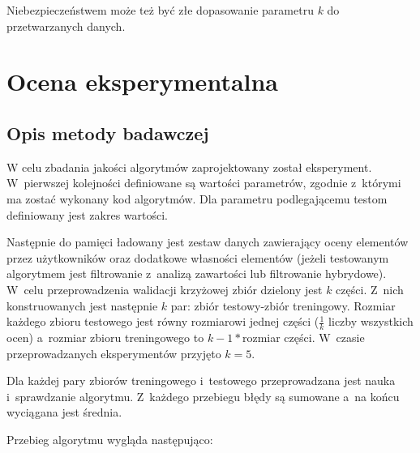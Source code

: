\documentclass[twoside]{iisthesis}
\begin{document}
		 Niebezpieczeństwem może też być złe dopasowanie parametru $k$ do przetwarzanych danych.
 
\chapter{Ocena eksperymentalna}
	\section{Opis metody badawczej}
	
		W celu zbadania jakości algorytmów zaprojektowany został eksperyment. W~pierwszej kolejności definiowane są wartości parametrów, zgodnie z~którymi ma zostać wykonany kod algorytmów. 
		Dla parametru podlegającemu testom definiowany jest zakres wartości. 
		
		Następnie do pamięci ładowany jest zestaw danych zawierający oceny elementów przez użytkowników oraz dodatkowe własności elementów (jeżeli testowanym algorytmem jest filtrowanie z~analizą zawartości lub filtrowanie hybrydowe). W~celu przeprowadzenia walidacji krzyżowej zbiór dzielony jest $k$ części. Z~nich konstruowanych jest następnie $k$ par: zbiór testowy-zbiór treningowy. Rozmiar każdego zbioru testowego jest równy rozmiarowi jednej części ($\frac{1}{k}$ liczby wszystkich ocen) a~rozmiar zbioru treningowego to $k-1*$rozmiar części. W~czasie przeprowadzanych eksperymentów przyjęto $k=5$.
		
		Dla każdej pary zbiorów treningowego i~testowego przeprowadzana jest nauka i~sprawdzanie algorytmu. Z~każdego przebiegu błędy są sumowane a~na końcu wyciągana jest średnia.
		
		Przebieg algorytmu wygląda następująco:
		
\end{document}
